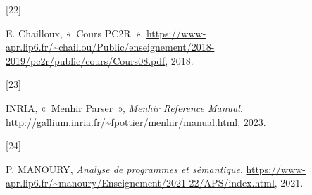 \documentclass[
  12pt,
]{article}
\newlength{\cslhangindent}
\newlength{\csllabelwidth}
\newlength{\cslentryspacingunit} %
\newenvironment{CSLReferences}[2] %
 {%
  \setlength{\parindent}{0pt}
  \ifodd #1
  \let\oldpar\par
  \def\par{\hangindent=\cslhangindent\oldpar}
  \fi
  \setlength{\parskip}{#2\cslentryspacingunit}
 }%
 {}
\newcommand{\CSLLeftMargin}[1]{\parbox[t]{\csllabelwidth}{#1}}
\newcommand{\CSLRightInline}[1]{\parbox[t]{\linewidth - \csllabelwidth}{#1}\break}
\begin{document}
\begin{CSLReferences}{0}{0}
  \leavevmode{}%
  \CSLLeftMargin{{[}22{]} }%
  \CSLRightInline{E. Chailloux, {«~Cours PC2R~»}.
    \url{https://www-apr.lip6.fr/~chaillou/Public/enseignement/2018-2019/pc2r/public/cours/Cours08.pdf},
    2018.}

  \leavevmode{}%
  \CSLLeftMargin{{[}23{]} }%
  \CSLRightInline{INRIA, {«~Menhir Parser~»}, \emph{Menhir Reference
      Manual}. \url{http://gallium.inria.fr/~fpottier/menhir/manual.html},
    2023.}

  \leavevmode{}%
  \CSLLeftMargin{{[}24{]} }%
  \CSLRightInline{P. MANOURY, \emph{Analyse de programmes et sémantique}.
    \url{https://www-apr.lip6.fr/~manoury/Enseignement/2021-22/APS/index.html},
    2021.}

\end{CSLReferences}
\end{document}
